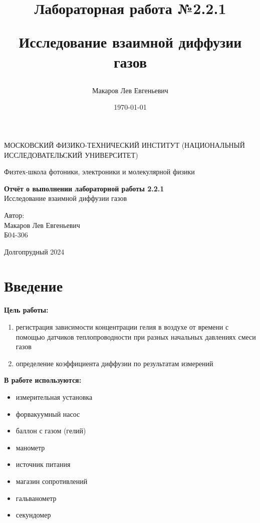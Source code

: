\documentclass[a4paper,12pt]{article}
\author{Макаров Лев Евгеньевич}
\title{Лабораторная работа №2.2.1

Исследование взаимной диффузии газов
}
\date{\today}
\begin{document}
\begin{titlepage}
	\begin{center}
		{\large МОСКОВСКИЙ ФИЗИКО-ТЕХНИЧЕСКИЙ ИНСТИТУТ (НАЦИОНАЛЬНЫЙ ИССЛЕДОВАТЕЛЬСКИЙ УНИВЕРСИТЕТ)}
	\end{center}
	\begin{center}
		{\large Физтех-школа фотоники, электроники и молекулярной физики}
	\end{center}
	
	
	\vspace{4.5cm}
	{\huge
		\begin{center}
			{\bf Отчёт о выполнении лабораторной работы 2.2.1}\\
			Исследование взаимной диффузии газов
		\end{center}
	}
	\vspace{2cm}
	\begin{flushright}
		{\LARGE Автор:\\ Макаров Лев Евгеньевич \\
			\vspace{0.2cm}
			Б04-306}
	\end{flushright}
	\vspace{8cm}
	\begin{center}
		Долгопрудный 2024
	\end{center}
\end{titlepage}

\section{Введение}

\textbf{Цель работы:} 
\begin{enumerate}
	\item регистрация зависимости концентрации гелия в воздухе от времени с помощью датчиков теплопроводности при разных начальных давлениях смеси газов
    \item определение коэффициента диффузии по результатам измерений
\end{enumerate}

\textbf{В работе используются:} 
\begin{itemize}
    \item измерительная установка
    \item форвакуумный насос
    \item баллон с газом (гелий)
    \item манометр
    \item источник питания
    \item магазин сопротивлений
    \item гальванометр
    \item секундомер
\end{itemize}
\medskip
\end{document}
